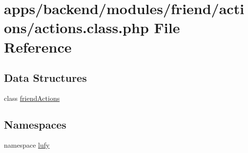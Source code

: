 \hypertarget{backend_2modules_2friend_2actions_2actions_8class_8php}{\section{apps/backend/modules/friend/actions/actions.class.\-php File Reference}
\label{backend_2modules_2friend_2actions_2actions_8class_8php}
}
\subsection*{Data Structures}
\begin{DoxyCompactItemize}
\item 
class \hyperlink{classfriend_actions}{friend\-Actions}
\end{DoxyCompactItemize}
\subsection*{Namespaces}
\begin{DoxyCompactItemize}
\item 
namespace \hyperlink{namespacelufy}{lufy}
\end{DoxyCompactItemize}
